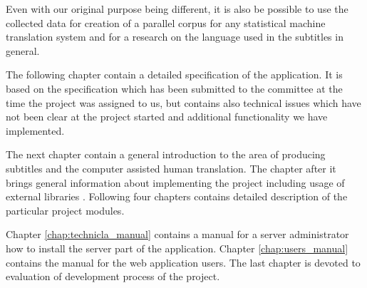 Even with our original purpose being different, it is also be possible to use the collected data for creation of a parallel corpus for any statistical machine translation system and for a research on the language used in the subtitles in general.

The following chapter contain a detailed specification of the application. It is based on the specification which has been submitted to the committee at the time the project was assigned to us, but contains also technical issues which have not been clear at the project started and additional functionality we have implemented. 

The next chapter contain a general introduction to the area of producing subtitles and the computer assisted human translation. The chapter after it brings general information about implementing the project including usage of external libraries . Following four chapters contains detailed description of the particular project modules.

Chapter \ref{chap:technicla_manual} contains a manual for a server administrator how to install the server part of the application. Chapter \ref{chap:users_manual} contains the manual for the web application users. The last chapter is devoted to evaluation of development process of the project.